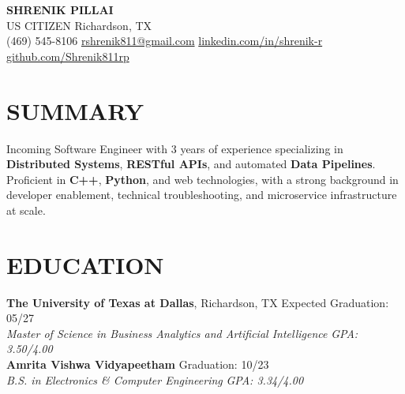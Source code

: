 \documentclass[11pt,letterpaper]{article}
\begin{document}
\begin{center}
{\LARGE \textbf{SHRENIK PILLAI}} \\ \vspace{2pt}
\small US CITIZEN \quad Richardson, TX \\ \vspace{1pt}
\small (469) 545-8106 \quad \href{mailto:rshrenik811@gmail.com}{rshrenik811@gmail.com} \quad \href{https://linkedin.com/in/shrenik-r}{linkedin.com/in/shrenik-r} \quad \href{https://github.com/Shrenik811rp}{github.com/Shrenik811rp}
\end{center}
\section*{SUMMARY}
\noindent\small Incoming Software Engineer with 3 years of experience specializing in \textbf{Distributed Systems}, \textbf{RESTful APIs}, and automated \textbf{Data Pipelines}. Proficient in \textbf{C++}, \textbf{Python}, and web technologies, with a strong background in developer enablement, technical troubleshooting, and microservice infrastructure at scale.
\section*{EDUCATION}
\noindent\small \textbf{The University of Texas at Dallas}, Richardson, TX \hfill Expected Graduation: 05/27 \\
\textit{Master of Science in Business Analytics and Artificial Intelligence} \hfill \textit{GPA: 3.50/4.00} \\
\noindent\small \textbf{Amrita Vishwa Vidyapeetham} \hfill Graduation: 10/23 \\
\textit{B.S. in Electronics \& Computer Engineering} \hfill \textit{GPA: 3.34/4.00}
\end{document}
